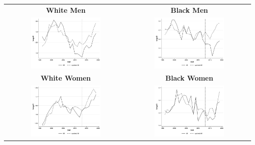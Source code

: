 \documentclass[11pt]{article}
\begin{document}
{\pagebreak
\begin{landscape}
\begin{table}[ht!]
    \centering
    \label{fig:synth_mi}
    \begin{tabular}{c c}
          \textbf{White Men} & \textbf{Black Men} \\    
          \includegraphics[width = 0.6\textwidth, keepaspectratio]{figures/fin_synth_wm_mi.png} & \includegraphics[width = 0.6\textwidth, keepaspectratio]{figures/fin_synth_bm_mi.png} \\
          \textbf{White Women} & \textbf{Black Women} \\
          \includegraphics[width = 0.6\textwidth, keepaspectratio]{figures/fin_synth_wf_mi.png} & \includegraphics[width = 0.6\textwidth, keepaspectratio]{figures/fin_synth_bf_mi.png}

\end{tabular}
\end{table}
\end{landscape}}
\end{document}
